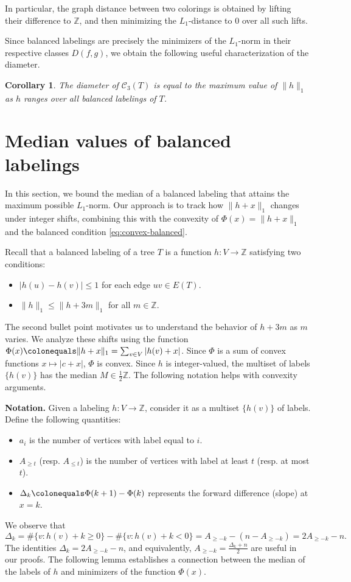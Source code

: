 \documentclass[12pt,reqno]{amsart}
\newtheorem{cor}[thm]{Corollary}
\theoremstyle{definition}
\newcommand{\C}{\mathcal{C}}
\newcommand{\Z}{\mathbb{Z}}
\begin{document}
In particular, the graph distance between two colorings is obtained by lifting their difference to $\mathbb{Z}$, and then minimizing the $L_1$-distance to $0$ over all such lifts.

Since balanced labelings are precisely the minimizers of the $L_1$-norm in their respective classes $D(f,g)$, we obtain the following useful characterization of the diameter.

\begin{cor}\label{cor:balanced}
    The diameter of $\C_3(T)$ is equal to the maximum value of $\|h\|_1$ as $h$ ranges over all balanced labelings of $T$.
\end{cor}

\section{Median values of balanced labelings}\label{sec:median}

In this section, we bound the median of a balanced labeling that attains the maximum possible $L_1$-norm. Our approach is to track how $\|h+x\|_1$ changes under integer shifts, combining this with the convexity of $\Phi(x)=\|h+x\|_1$ and the balanced condition \eqref{eq:convex-balanced}.


Recall that a balanced labeling of a tree $T$ is a function $h\colon V\to \mathbb{Z}$ satisfying two conditions:
\begin{itemize}
    \item $|h(u)-h(v)|\leq 1$ for each edge $uv\in E(T)$.
    \item $\|h\|_1 \le \|h+3m\|_1$ for all $m\in \Z$.
\end{itemize}
The second bullet point motivates us to understand the behavior of $h+3m$ as $m$ varies. We analyze these shifts using the function $\Phi(x) \colonequals \|h+x\|_1 = \sum_{v\in V} |h(v)+x|$. Since $\Phi$ is a sum of convex functions $x \mapsto |c+x|$, $\Phi$ is convex. Since $h$ is integer-valued, the multiset of labels $\{h(v)\}$ has the median $M\in \frac{1}{2} \mathbb{Z}$. The following notation helps with convexity arguments.

\textbf{Notation.} Given a labeling $h\colon V\to \Z$, consider it as a multiset $\{h(v)\}$ of labels. Define the following quantities:
\begin{itemize}
    \item $a_i$ is the number of vertices with label equal to $i$.
    \item $A_{\geq t}$ (resp. $A_{\leq t}$) is the number of vertices with label at least $t$ (resp. at most $t$).
    \item $\Delta_k \colonequals \Phi(k+1)-\Phi(k)$ represents the forward difference (slope) at $x=k$.
\end{itemize}
We observe that
\[
\Delta_k = \#\{v : h(v)+k \ge 0\} - \#\{v : h(v)+k < 0\} = A_{\ge -k} - (n - A_{\ge -k}) = 2A_{\ge -k} - n.
\]
The identities $\Delta_k = 2A_{\geq -k}-n$, and equivalently, $A_{\geq -k} = \frac{\Delta_k+n}{2}$ are useful in our proofs. The following lemma establishes a connection between the median of the labels of $h$ and minimizers of the function $\Phi(x)$. 
\end{document}

